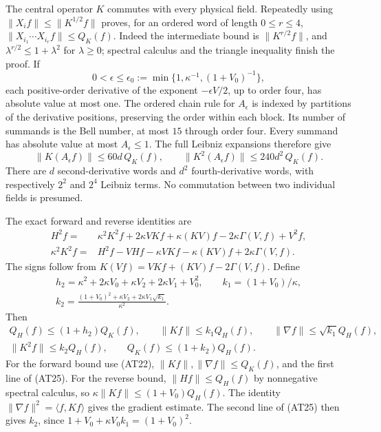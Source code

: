 \documentclass[11pt]{article}
\begin{document}
The central operator \(K\) commutes with every physical field. Repeatedly using \(\|X_i f\|\le\|K^{1/2}f\|\) proves, for an ordered word of length \(0\le r\le4\),
\(\|X_{i_1}\cdots X_{i_r}f\|\le Q_K(f)\).
Indeed the intermediate bound is \(\|K^{r/2}f\|\), and
\(\lambda^{r/2}\le1+\lambda^2\) for \(\lambda\ge0\); spectral calculus and the triangle inequality finish the proof.
If
\[
 0<\epsilon\le\epsilon_0:=\min\{1,\kappa^{-1},(1+V_0)^{-1}\},
 \tag{AT23}
\]
each positive-order derivative of the exponent \(-\epsilon V/2\), up to order four, has absolute value at most one. The ordered chain rule for \(A_\epsilon\) is indexed by partitions of the derivative positions, preserving the order within each block. Its number of summands is the Bell number, at most \(15\) through order four. Every summand has absolute value at most \(A_\epsilon\le1\). The full Leibniz expansions therefore give
\[
 \|K(A_\epsilon f)\|\le60d\,Q_K(f),\qquad
 \|K^2(A_\epsilon f)\|\le240d^2\,Q_K(f).
 \tag{AT24}
\]
There are \(d\) second-derivative words and \(d^2\) fourth-derivative words, with respectively \(2^2\) and \(2^4\) Leibniz terms. No commutation between two individual fields is presumed.

The exact forward and reverse identities are
\[
 \begin{aligned}
 H^2f={}&\kappa^2K^2f+2\kappa V Kf+\kappa(KV)f
                -2\kappa\Gamma(V,f)+V^2f,\\
 \kappa^2K^2f={}&H^2f-VHf-\kappa V Kf-\kappa(KV)f
                          +2\kappa\Gamma(V,f).
 \end{aligned}\tag{AT25}
\]
The signs follow from \(K(Vf)=VKf+(KV)f-2\Gamma(V,f)\). Define
\[
 \begin{gathered}
 h_2=\kappa^2+2\kappa V_0+\kappa V_2+2\kappa V_1+V_0^2,\qquad
 k_1=(1+V_0)/\kappa,\\
 k_2=\frac{(1+V_0)^2+\kappa V_2+
                    2\kappa V_1\sqrt{k_1}}{\kappa^2}.
 \end{gathered}\tag{AT26}
\]
Then
\[
 \begin{gathered}
 Q_H(f)\le(1+h_2)Q_K(f),\qquad
 \|Kf\|\le k_1Q_H(f),\qquad
 \|\nabla f\|\le\sqrt{k_1}Q_H(f),\\
 \|K^2f\|\le k_2Q_H(f),\qquad
 Q_K(f)\le(1+k_2)Q_H(f).
 \end{gathered}\tag{AT27}
\]
For the forward bound use (AT22), \(\|Kf\|,\|\nabla f\|\le Q_K(f)\), and the first line of (AT25). For the reverse bound,
\(\|Hf\|\le Q_H(f)\) by nonnegative spectral calculus, so
\(\kappa\|Kf\|\le(1+V_0)Q_H(f)\).
The identity \(\|\nabla f\|^2=\langle f,Kf\rangle\) gives the gradient estimate. The second line of (AT25) then gives \(k_2\), since
\(1+V_0+\kappa V_0k_1=(1+V_0)^2\).
\end{document}

